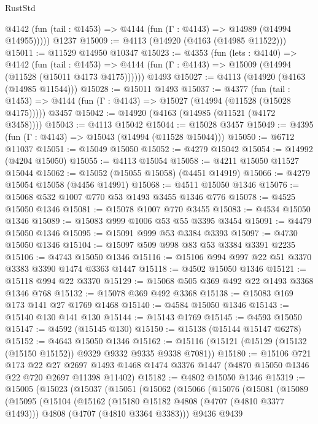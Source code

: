 \begin{lexlean}{RustStd}
\begin{coremodule}
      @4142 (fun (tail : @1453) => @4144 (fun (Γ : @4143) => @14989 (@14994 @14955)))))
    @1237
@15009 := @4113 (@14920 (@4163 (@14985 @11522)))
@15011 := @11529 @14950 @10347
@15023 := @4353
    (fun (lets : @4140) =>
    @4142
      (fun (tail : @1453) =>
      @4144 (fun (Γ : @4143) => @15009 (@14994 (@11528 (@15011 @4173 @4175))))))
    @1493
@15027 := @4113 (@14920 (@4163 (@14985 @11544)))
@15028 := @15011 @1493
@15037 := @4377
    (fun (tail : @1453) => @4144 (fun (Γ : @4143) => @15027 (@14994 (@11528 (@15028 @4175)))))
    @3457
@15042 := @14920 (@4163 (@14985 (@11521 (@4172 @3458))))
@15043 := @4113 @15042
@15044 := @15028 @3457
@15049 := @4395 (fun (Γ : @4143) => @15043 (@14994 (@11528 @15044)))
@15050 := @6712 @11037
@15051 := @15049 @15050
@15052 := @4279 @15042
@15054 := @14992 (@4204 @15050)
@15055 := @4113 @15054
@15058 := @4211 @15050 @11527 @15044
@15062 := @15052 (@15055 @15058) (@4451 @14919)
@15066 := @4279 @15054 @15058 (@4456 @14991)
@15068 := @4511 @15050 @1346
@15076 := @15068 @532 @1007 @770 @53 @1493 @3455 @1346 @776
@15078 := @4525 @15050 @1346
@15081 := @15078 @1007 @770 @3455
@15083 := @4534 @15050 @1346
@15089 := @15083 @999 @1006 @53 @55 @3395 @3454
@15091 := @4479 @15050 @1346
@15095 := @15091 @999 @53 @3384 @3393
@15097 := @4730 @15050 @1346
@15104 := @15097 @509 @998 @83 @53 @3384 @3391 @2235
@15106 := @4743 @15050 @1346
@15116 := @15106 @994 @997 @22 @51 @3370 @3383 @3390 @1474 @3363 @1447
@15118 := @4502 @15050 @1346
@15121 := @15118 @994 @22 @3370
@15129 := @15068 @505 @369 @492 @22 @1493 @3368 @1346 @768
@15132 := @15078 @369 @492 @3368
@15138 := @15083 @169 @173 @141 @27 @1769 @1468
@15140 := @4584 @15050 @1346
@15143 := @15140 @130 @141 @130
@15144 := @15143 @1769
@15145 := @4593 @15050
@15147 := @4592 (@15145 @130)
@15150 := @15138 (@15144 @15147 @6278)
@15152 := @4643 @15050 @1346
@15162 := @15116 (@15121 (@15129 (@15132 (@15150 @15152)) @9329 @9332 @9335 @9338 @7081))
@15180 := @15106
    @721
    @173
    @22
    @27
    @2697
    @1493
    @1468
    @1474
    @3376
    @1447
    (@4870 @15050 @1346 @22 @720 @2697 @11398 @11402)
@15182 := @4802 @15050 @1346
@15319 := @15005
    (@15023
      (@15037
        (@15051
          (@15062
            (@15066
              (@15076
                (@15081
                  (@15089
                    (@15095
                      (@15104
                        (@15162
                          (@15180 @15182 @4808 (@4707 (@4810 @3377 @1493)))
                          @4808
                          (@4707 (@4810 @3364 @3383)))
                        @9436
                        @9439

\end{coremodule}
\end{lexlean}
